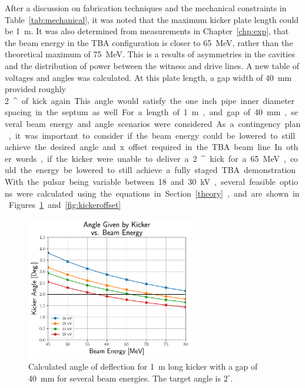 After a discussion on fabrication techniques and the mechanical constraints in Table~\ref{tab:mechanical}, 
it was noted that the maximum kicker plate length could be \SI{1}{m}. 
It was also determined from measurements in Chapter~\ref{chp:exp}, 
that the beam energy in the TBA configuration is closer to \SI{65}{MeV}, 
rather than the theoretical maximum of \SI{75}{MeV}.
This is a results of asymmetries in the cavities and the distribution of power
between the witness and drive lines.
A new table of voltages and angles was calculated. At this plate length, 
a gap width of \SI{40}{mm} provided roughly \SI{2}{^\circ} of kick again. 
This angle would satisfy the one inch pipe inner diameter spacing in the septum as well. 

For a length of \SI{1}{m}, and gap of \SI{40}{mm}, 
several beam energy and angle scenarios were considered.
As a contingency plan, it was important to consider if the 
beam energy could be lowered to still achieve the desired 
angle and x offset required in the TBA beam line. 
In other words, if the kicker were unable to deliver a \SI{2}{^\circ}
kick for a \SI{65}{MeV}, could the energy be lowered to still achieve
a fully staged TBA demonstration. 
With the pulsar being variable between 18 and 30 kV,
several feasible options were calculated using the equations in Section \ref{theory}, 
and are shown in Figures~\ref{fig:kickerangles} and \ref{fig:kickeroffset}
\begin{figure}%
	\begin{center}
		\includegraphics[width=0.65\textwidth]{./images/AngleVsEnergy}
		\caption{Calculated angle of deflection for \SI{1}{m} long 
		kicker with a gap of \SI{40}{mm} for several beam energies. The target angle is $2^\circ$.}
		\label{fig:kickerangles}
	\end{center}
\end{figure}
